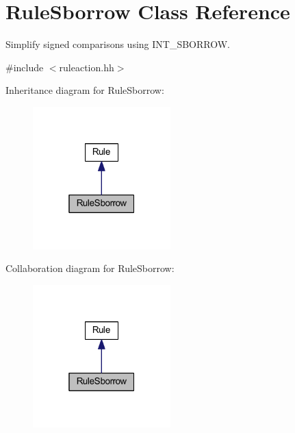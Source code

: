 \hypertarget{class_rule_sborrow}{}\section{Rule\+Sborrow Class Reference}
\label{class_rule_sborrow}


Simplify signed comparisons using I\+N\+T\+\_\+\+S\+B\+O\+R\+R\+OW.  




{\ttfamily \#include $<$ruleaction.\+hh$>$}



Inheritance diagram for Rule\+Sborrow\+:
\nopagebreak
\begin{figure}[H]
\begin{center}
\leavevmode
\includegraphics[width=151pt]{class_rule_sborrow__inherit__graph}
\end{center}
\end{figure}


Collaboration diagram for Rule\+Sborrow\+:
\nopagebreak
\begin{figure}[H]
\begin{center}
\leavevmode
\includegraphics[width=151pt]{class_rule_sborrow__coll__graph}
\end{center}
\end{figure}
